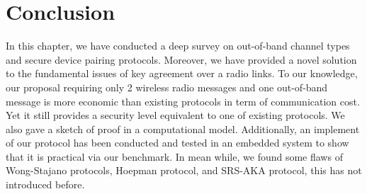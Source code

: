 \section{Conclusion}

In this chapter, we have conducted a deep survey on out-of-band channel types and secure device pairing protocols. Moreover, we have provided a novel solution to the fundamental issues of key agreement over a radio links. To our knowledge, our proposal requiring only 2 wireless radio messages and one out-of-band message is more economic than existing protocols in term of communication cost. Yet it still provides a security level equivalent to one of existing protocols. We also gave a sketch of proof in a computational model. Additionally, an implement of our protocol has been conducted and tested in an embedded system to show that it is practical via our benchmark. In mean while, we found some flaws of Wong-Stajano protocols, Hoepman protocol, and SRS-AKA protocol, this has not introduced before. 




